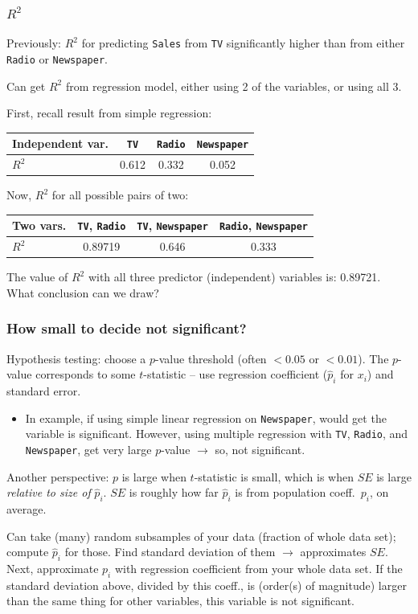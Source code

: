 \documentclass{beamer}
\theoremstyle{example}
\newcommand{\ttt}[1]{{\small\texttt{#1}}}
\begin{document}
\begin{frame}
\frametitle{$R^2$}
Previously: $R^2$ for predicting \ttt{Sales} from \ttt{TV} significantly higher than from either \ttt{Radio} or \ttt{Newspaper}. 

\pause
Can get $R^2$ from regression model, either using 2 of the variables, or using all 3. 

First, recall result from simple regression:
\begin{center}
    \begin{tabular}{l c c c}
        Independent var. & \ttt{TV} & \ttt{Radio} & \ttt{Newspaper} \\ 
        \hline 
        $R^2$       &  0.612  &  0.332  &  0.052
    \end{tabular}
\end{center}

\pause
Now, $R^2$ for all possible pairs of two:
\begin{center}
    \begin{tabular}{l c c c}
        Two vars. & \ttt{TV}, \ttt{Radio} & \ttt{TV}, \ttt{Newspaper} & \ttt{Radio}, \ttt{Newspaper} \\ 
        \hline 
        $R^2$       &  0.89719  &  0.646  &  0.333
    \end{tabular}
\end{center}

\pause
The value of $R^2$ with all three predictor (independent) variables is: 0.89721. {\color{strings}What conclusion can we draw?}

\end{frame}

\begin{frame}
    \frametitle{How small to decide not significant?}
    
    \pause 
    Hypothesis testing: choose a $p$-value threshold (often $<0.05$ or $<0.01$). The $p$-value corresponds to some $t$-statistic {--} use regression coefficient ($\hat{p}_i$ for $x_i$) and standard error.
    \begin{itemize}
        \item In example, if using simple linear regression on \ttt{Newspaper}, would get the variable is significant. However, using multiple regression with \ttt{TV}, \ttt{Radio}, and \ttt{Newspaper}, get very large $p$-value $\to$ so, not significant.
    \end{itemize}

    \pause 
    Another perspective: $p$ is large when $t$-statistic is small, which is when $SE$ is large \emph{relative to size of }$\hat{p}_i$. $SE$ is roughly how far $\hat{p}_i$ is from population coeff.\ $p_i$, on average.

    \pause 
    Can take (many) random subsamples of your data (fraction of whole data set); compute $\hat{p}_i$ for those. Find standard deviation of them $\to$ approximates $SE$. \newline 
    Next, approximate $p_i$ with regression coefficient from your whole data set. If the standard deviation above, divided by this coeff., is (order(s) of magnitude) larger than the same thing for other variables, this variable is not significant.
\end{frame}
\end{document}
